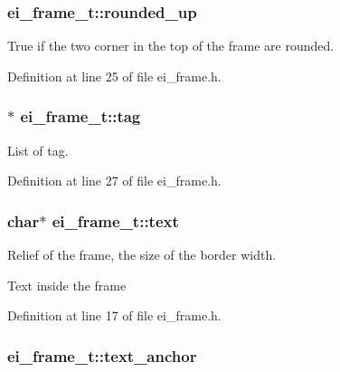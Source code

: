 \hypertarget{structei__frame__t_a4e35bcc8ad8edb5032d7dce24f419928}{
\subsubsection[{rounded\+\_\+up}]{ ei\+\_\+frame\+\_\+t\+::rounded\+\_\+up}}\label{structei__frame__t_a4e35bcc8ad8edb5032d7dce24f419928}


True if the two corner in the top of the frame are rounded. 



Definition at line 25 of file ei\+\_\+frame.\+h.

\hypertarget{structei__frame__t_adfe60fa92f5065b279f46b716f2ccd73}{
\subsubsection[{tag}]{$\ast$ ei\+\_\+frame\+\_\+t\+::tag}}\label{structei__frame__t_adfe60fa92f5065b279f46b716f2ccd73}


List of tag. 



Definition at line 27 of file ei\+\_\+frame.\+h.

\hypertarget{structei__frame__t_a5fd5ab12410cb7eb268c13e042624349}{
\subsubsection[{text}]{\setlength{\rightskip}{0pt plus 5cm}char$\ast$ ei\+\_\+frame\+\_\+t\+::text}}\label{structei__frame__t_a5fd5ab12410cb7eb268c13e042624349}


Relief of the frame, the size of the border width. 

Text inside the frame 

Definition at line 17 of file ei\+\_\+frame.\+h.

\hypertarget{structei__frame__t_a54264b4e7016d27c03e59da289d079fb}{
\subsubsection[{text\+\_\+anchor}]{ ei\+\_\+frame\+\_\+t\+::text\+\_\+anchor}}\label{structei__frame__t_a54264b4e7016d27c03e59da289d079fb}


